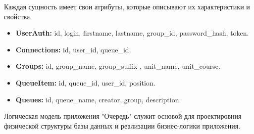 
Каждая сущность имеет свои атрибуты,
которые описывают их характеристики и свойства.

\begin{itemize}
    \item \textbf{UserAuth:} id, login, firstname, lastname, group\_id,
		password\_hash, token.
    \item \textbf{Connections:} id, user\_id, queue\_id.
    \item \textbf{Groups:} id, group\_name, group\_suffix
		, unit\_name, unit\_course.
    \item \textbf{QueueItem:} id, queue\_id, user\_id, position.
    \item \textbf{Queues:} id, queue\_name, creator, group, description.
\end{itemize}

Логическая модель приложения "Очередь" служит основой для проектировния
физической структуры базы данных и реализации бизнес-логики приложения.

